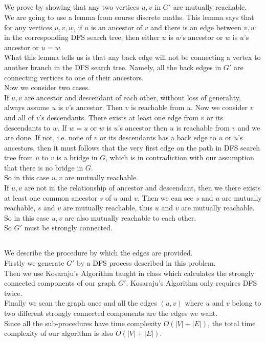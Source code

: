 \documentclass[12pt,letterpaper]{article}
\begin{document}
\subsection{}
We prove by showing that any two vertices $u,v$ in $G'$ are mutually reachable.\\
We are going to use a lemma from course discrete maths. This lemma says that for any vertices $u,v,w$, if $u$ is an ancestor of $v$ and there is an edge between $v,w$ in the corresponding DFS search tree, then either $u$ is $w$'s ancestor or $w$ is $u$'s ancestor or $u=w$. \\
What this lemma tells us is that any back edge will not be connecting a vertex to another branch in the DFS search tree. Namely, all the back edges in $G'$ are connecting vertices to one of their ancestors.\\
Now we consider two cases.\\
If $u,v$ are ancestor and descendant of each other, without loss of generality, always assume $u$ is $v$'s ancestor. Then $v$ is reachable from $u$. Now we consider $v$ and all of $v$'s descendants.
There exists at least one edge from $v$ or its descendants to $w$. If $w=u$ or $w$ is $u$'s ancestor then $u$ is reachable from $v$ and we are done. If not, i.e. none of $v$ or its descendants has a back edge to $u$ or $u$'s ancestors, then it must follows that 
the very first edge on the path in DFS search tree from $u$ to $v$ is a bridge in $G$, which is in contradiction with our assumption that there is no bridge in $G$.\\
So in this case $u,v$ are mutually reachable.\\
If $u,v$ are not in the relationship of ancestor and descendant, then we there exists at least one common ancestor $s$ of $u$ and $v$. Then we can see $s$ and $u$ are mutually reachable, $s$ and $v$ are mutually reachable, thus $u$ and $v$ are mutually reachable. 
So in this case $u,v$ are also mutually reachable to each other.\\
So $G'$ must be strongly connected.

\subsection{}
We describe the procedure by which the edges are provided.\\
Firstly we generate $G'$ by a DFS process described in this problem.\\
Then we use Kosaraju's Algorithm taught in class which calculates the strongly connected components of our graph $G'$. Kosaraju's Algorithm only requires DFS twice.\\
Finally we scan the graph once and all the edges $(u,v)$ where $u$ and $v$ belong to two different strongly connected components are the edges we want.\\
Since all the sub-procedures have time complexity $O(|V|+|E|)$, the total time complexity of our algorithm is also $O(|V|+|E|)$.
\end{document}
